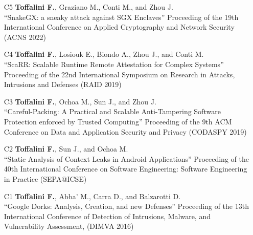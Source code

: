 \begin{enumerate}[leftmargin=5mm]
\item[C5] \textbf{Toffalini F.}, Graziano M., Conti M., and Zhou J.\\``SnakeGX: a sneaky attack against SGX Enclaves'' Proceeding of the 19th International Conference on Applied Cryptography and Network Security (ACNS 2022) 
\item[C4] \textbf{Toffalini F.}, Losiouk E., Biondo A., Zhou J., and Conti M.\\``ScaRR: Scalable Runtime Remote Attestation for Complex Systems'' Proceeding of the 22nd International Symposium on Research in Attacks, Intrusions and Defenses (RAID 2019) 
\item[C3] \textbf{Toffalini F.}, Ochoa M., Sun J., and Zhou J.\\``Careful-Packing: A Practical and Scalable Anti-Tampering Software Protection enforced by Trusted Computing'' Proceeding of the 9th ACM Conference on Data and Application Security and Privacy (CODASPY 2019) 
\item[C2] \textbf{Toffalini F.}, Sun J., and Ochoa M.\\``Static Analysis of Context Leaks in Android Applications'' Proceeding of the 40th International Conference on Software Engineering: Software Engineering in Practice (SEPA@ICSE) 
\item[C1] \textbf{Toffalini F.}, Abba' M., Carra D., and Balzarotti D.\\``Google Dorks: Analysis, Creation, and new Defenses'' Proceeding of the 13th International Conference of Detection of Intrusions, Malware, and Vulnerability Assessment, (DIMVA 2016) 
\end{enumerate}
